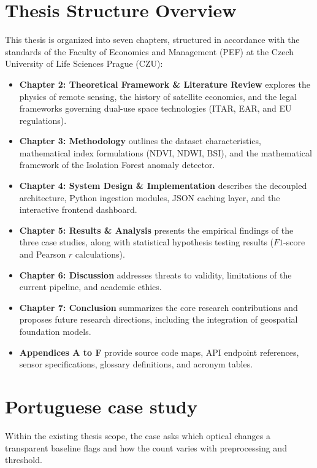 \section{Thesis Structure Overview}
This thesis is organized into seven chapters, structured in accordance with the standards of the Faculty of Economics and Management (PEF) at the Czech University of Life Sciences Prague (CZU):
\begin{itemize}
  \item \textbf{Chapter 2: Theoretical Framework \& Literature Review} explores the physics of remote sensing, the history of satellite economics, and the legal frameworks governing dual-use space technologies (ITAR, EAR, and EU regulations).
  \item \textbf{Chapter 3: Methodology} outlines the dataset characteristics, mathematical index formulations (NDVI, NDWI, BSI), and the mathematical framework of the Isolation Forest anomaly detector.
  \item \textbf{Chapter 4: System Design \& Implementation} describes the decoupled architecture, Python ingestion modules, JSON caching layer, and the interactive frontend dashboard.
  \item \textbf{Chapter 5: Results \& Analysis} presents the empirical findings of the three case studies, along with statistical hypothesis testing results ($F1$-score and Pearson $r$ calculations).
  \item \textbf{Chapter 6: Discussion} addresses threats to validity, limitations of the current pipeline, and academic ethics.
  \item \textbf{Chapter 7: Conclusion} summarizes the core research contributions and proposes future research directions, including the integration of geospatial foundation models.
  \item \textbf{Appendices A to F} provide source code maps, API endpoint references, sensor specifications, glossary definitions, and acronym tables.

\end{itemize}

\section{Portuguese case study}
Within the existing thesis scope, the case asks which optical changes a transparent baseline flags and how the count varies with preprocessing and threshold.
